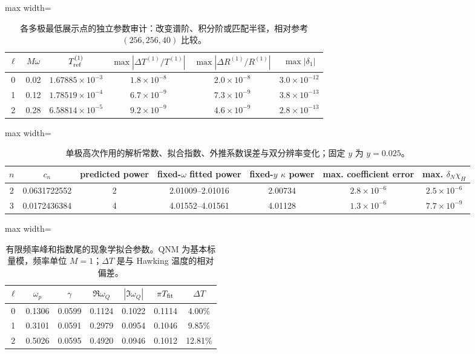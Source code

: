 \begin{table}[htbp]
\centering
\caption{各多极最低展示点的独立参数审计：改变谱阶、积分阶或匹配半径，相对参考 $(256,256,40)$ 比较。}
\label{note-tab:low-convergence}
\begin{adjustbox}{max width=\textwidth}
\begin{tabular}{c c c c c c}
$\ell$ & $M\omega$ & $T^{(1)}_{\rm ref}$
& $\max|\Delta T^{(1)}/T^{(1)}|$
& $\max|\Delta R^{(1)}/R^{(1)}|$ & $\max|\delta_1|$\\
\hline
0 & 0.02 & $1.67885\times10^{-3}$ & $1.8\times10^{-8}$ & $2.0\times10^{-8}$ & $3.0\times10^{-12}$\\
1 & 0.12 & $1.78519\times10^{-4}$ & $6.7\times10^{-9}$ & $7.3\times10^{-9}$ & $3.8\times10^{-13}$\\
2 & 0.28 & $6.58814\times10^{-5}$ & $9.2\times10^{-9}$ & $4.6\times10^{-9}$ & $2.8\times10^{-13}$\\
\end{tabular}
\end{adjustbox}
\end{table}

\begin{table}[htbp]
\centering
\caption{单极高次作用的解析常数、拟合指数、外推系数误差与双分辨率变化；固定 $y$ 为 $y=0.025$。}
\label{note-tab:power-l0}
\begin{adjustbox}{max width=\textwidth}
\begin{tabular}{c c c c c c c}
$n$ & $c_n$ & predicted power & fixed-$\omega$ fitted power
& fixed-$y$ $\kappa$ power & max. coefficient error & max. $\delta_N\chi_H$\\
\hline
2 & 0.0631722552 & 2 & 2.01009--2.01016 & 2.00734 & $2.8\times10^{-6}$ & $2.5\times10^{-6}$\\
3 & 0.0172436384 & 4 & 4.01552--4.01561 & 4.01128 & $1.3\times10^{-6}$ & $7.7\times10^{-9}$\\
\end{tabular}
\end{adjustbox}
\end{table}

\begin{table}[htbp]
\centering
\caption{有限频率峰和指数尾的现象学拟合参数。QNM 为基本标量模，频率单位 $M=1$；$\Delta T$ 是与 Hawking 温度的相对偏差。}
\label{note-tab:fit}
\begin{adjustbox}{max width=\textwidth}
\begin{tabular}{c c c c c c c}
$\ell$ & $\omega_p$ & $\gamma$
& $\Re\omega_Q$
& $|\Im\omega_Q|$
& $\pi T_{\rm fit}$
& $\Delta T$\\
\hline
0 & 0.1306 & 0.0599 & 0.1124 & 0.1022 & 0.1114 & 4.00\%\\
1 & 0.3101 & 0.0591 & 0.2979 & 0.0954 & 0.1046 & 9.85\%\\
2 & 0.5026 & 0.0595 & 0.4920 & 0.0946 & 0.1012 & 12.81\%\\
\end{tabular}
\end{adjustbox}
\end{table}

